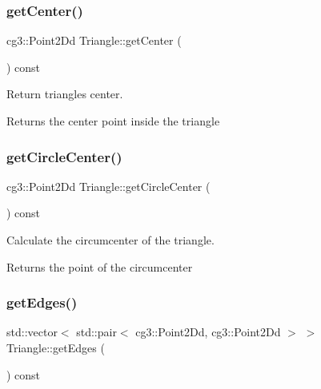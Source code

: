 \subsubsection{\texorpdfstring{get\+Center()}{getCenter()}}
{\footnotesize\ttfamily cg3\+::\+Point2\+Dd Triangle\+::get\+Center (\begin{DoxyParamCaption}{ }\end{DoxyParamCaption}) const\hspace{0.3cm}{\ttfamily [inline]}}



Return triangle\textquotesingle{}s center. 

\begin{DoxyReturn}{Returns}
the center point inside the triangle 
\end{DoxyReturn}
\mbox{\label{classTriangle_a0889cfdbbf72330793f0b4327a335c2b}} 
\subsubsection{\texorpdfstring{get\+Circle\+Center()}{getCircleCenter()}}
{\footnotesize\ttfamily cg3\+::\+Point2\+Dd Triangle\+::get\+Circle\+Center (\begin{DoxyParamCaption}{ }\end{DoxyParamCaption}) const}



Calculate the circumcenter of the triangle. 

\begin{DoxyReturn}{Returns}
the point of the circumcenter 
\end{DoxyReturn}
\mbox{\label{classTriangle_a0b67c787d0d6e2fcf38da1d534463e41}} 
\subsubsection{\texorpdfstring{get\+Edges()}{getEdges()}}
{\footnotesize\ttfamily std\+::vector$<$ std\+::pair$<$ cg3\+::\+Point2\+Dd, cg3\+::\+Point2\+Dd $>$ $>$ Triangle\+::get\+Edges (\begin{DoxyParamCaption}{ }\end{DoxyParamCaption}) const\hspace{0.3cm}{\ttfamily [inline]}}



